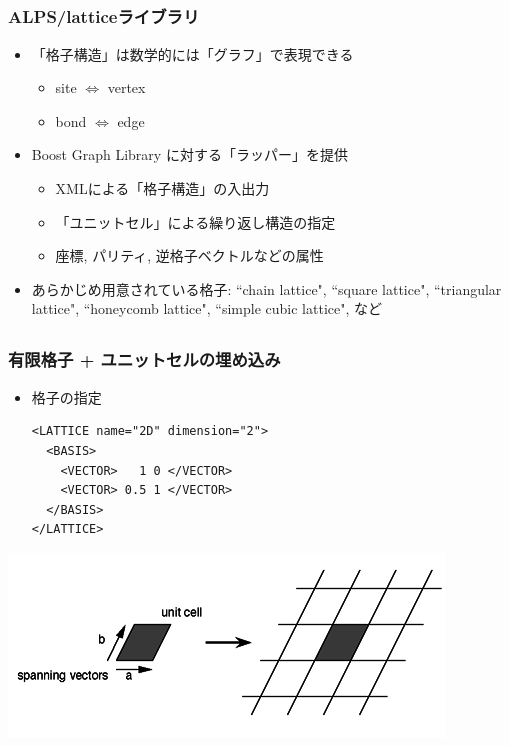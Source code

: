 \subsection*{\redm\whiteb\greenb}
\begin{frame}
  \frametitle{ALPS/latticeライブラリ}
  \begin{itemize}
    \setlength{\itemsep}{1em}
  \item 「格子構造」は数学的には「グラフ」で表現できる
    \begin{itemize}
    \item site $\Leftrightarrow$ vertex
    \item bond $\Leftrightarrow$ edge
    \end{itemize}
  \item Boost Graph Library に対する「ラッパー」を提供
    \begin{itemize}
    \item XMLによる「格子構造」の入出力
    \item 「ユニットセル」による繰り返し構造の指定
    \item 座標, パリティ, 逆格子ベクトルなどの属性
    \end{itemize}
  \item あらかじめ用意されている格子: ``chain lattice", ``square lattice", ``triangular lattice", ``honeycomb lattice", ``simple cubic lattice", など
  \end{itemize}
\end{frame}

\subsection*{\redm\whiteb\greenb}
\begin{frame}[t,fragile]
  \frametitle{有限格子 + ユニットセルの埋め込み}
  \begin{itemize}
  \item 格子の指定
  \begin{lstlisting}
<LATTICE name="2D" dimension="2">
  <BASIS>
    <VECTOR>   1 0 </VECTOR>
    <VECTOR> 0.5 1 </VECTOR>
  </BASIS>
</LATTICE>
\end{lstlisting}
  \end{itemize}
  \begin{center}
    \includegraphics[height=0.3\textheight]{TutorialLatticeHOWTOLattice1}
  \end{center}
\end{frame}

